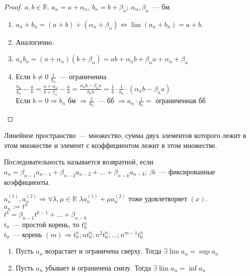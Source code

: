 \documentclass[12pt]{article}
\begin{document}
	\begin{proof}
		$a, b \in \mathbb{R}$. $a_n = a + \alpha_n$, $b_n = b + \beta_n$; $\alpha_n, \beta_n$~--- бм. 
		\begin{enumerate}
			\item
			$a_n + b_n = (a + b) + (\alpha_n + \beta_n) \Leftrightarrow \lim (a_n + b_n) = a + b$.
			\item Аналогично.
			\item $a_nb_n = (a + \alpha_n)(b + \beta_n) = ab + \alpha_nb + \beta_na + \alpha_n + \beta_n$
			\item Если $b \not= 0$ $\frac{1}{b_n}$~--- ограниченна \\
			$\frac{a_n}{b_n} - \frac{a}{b} = \frac{a + \alpha_n}{b + \beta_n} - \frac{a}{b} = \frac{\alpha_nb - \beta_na}{b_nb} = \frac{1}{b} \cdot \frac{1}{b_n} \cdot (\alpha_nb - \beta_na)$ \\
			Если $b = 0 \Rightarrow b_n$ бм $\Rightarrow \frac{1}{b_n}$~--- бб $\Rightarrow a_n \cdot \frac{1}{b_n} =$ ограниченная бб
		\end{enumerate}
	\end{proof}
	\begin{definition}
		Линейное пространство~--- множество, сумма двух элементов которого лежит в этом множестве и элемент с коэффициентом лежит в этом множестве.
	\end{definition}
	\begin{definition}
		Последовательность называется возвратной, если $a_n = \beta_{n - 1} a_{n - 1} + \beta_{n - 2} a_{n - 2} + \dots + \beta_{n - k} a_{n - k}$; $\beta{i}$~--- фиксированные коэффициенты.
	\end{definition}
	\noindent
	$a_n^{(1)}, a_n^{(2)} \Rightarrow \forall \lambda, \mu \in \mathbb{R}$ $\lambda a_n^{(1)} + \mu a_n^{(2)}$ тоже удовлетворяет $(x)$. \\
	$a_n := t^n$ \\
	$t^k = \beta_{n - 1}t^{k - 1} + \dots + \beta_{n - k}$ \\
	$t_0$~--- простой корень, то $t_0^n$ \\
	$t_0$~--- корень $(m) \Rightarrow t_0^n; nt_0^n; n^2t_0^n; \dots; n^{m - 1}t_0^n$ \\
	\begin{theorem}
		\begin{enumerate}
			\item Пусть $a_n$ возрастает и ограничена сверху. Тогда $\exists \lim a_n = \sup a_n$
			\item Пусть $a_n$ убывает и ограничена снизу. Тогда $\exists \lim a_n = \inf a_n$
		\end{enumerate}
	\end{theorem}
\end{document}
